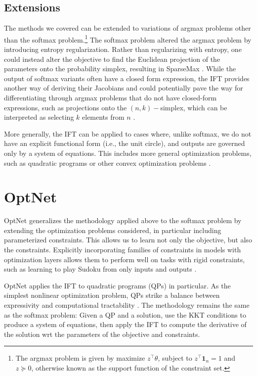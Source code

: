 \documentclass[11pt]{article}
\begin{document}
\subsection{Extensions}
The methods we covered can be extended to variations of argmax problems
other than the softmax problem.\footnote{
The argmax problem is given by maximize $z^\top \theta$, subject to $z^\top\mathbf{1}_n=1$
and $z\succeq 0$, otherwise known as the support function of the constraint set.
}
The softmax problem altered the argmax problem by introducing entropy regularization.
Rather than regularizing with entropy, one could instead alter the objective to find
the Euclidean projection of the parameters onto the probability simplex,
resulting in SparseMax \citep{sparsemax}.
While the output of softmax variants often have a closed form expression,
the IFT provides another way of deriving their Jacobians
and could potentially pave the way for differentiating through argmax problems
that do not have closed-form expressions,
such as projections onto the $(n,k)-$simplex,
which can be interpreted as selecting $k$ elements from $n$ \citep{rankmax}.

More generally, the IFT can be applied to cases where, unlike softmax,
we do not have an explicit functional form (i.e., the unit circle),
and outputs are governed only by a system of equations.
This includes more general optimization problems, such as quadratic programs \citep{optnet}
or other convex optimization problems \citep{agrawal2019diffcvx}.

\section{OptNet}
\label{sec:optnet}
OptNet generalizes the methodology applied above to the softmax problem by
extending the optimization problems considered,
in particular including parameterized constraints.
This allows us to learn not only the objective, but also the constraints.
Explicitly incorporating families of constraints in models
with optimization layers allows them to perform well
on tasks with rigid constraints, such as learning to play
Sudoku from only inputs and outputs \citep{optnet}.

OptNet applies the IFT to quadratic programs (QPs) in particular.
As the simplest nonlinear optimization problem,
QPs strike a balance between expressivity and computational tractability \citep{simplex}.
The methodology remains the same as the softmax problem:
Given a QP and a solution,
use the KKT conditions to produce a system of equations, then apply the IFT
to compute the derivative of the solution wrt the
parameters of the objective and constraints.
\end{document}
